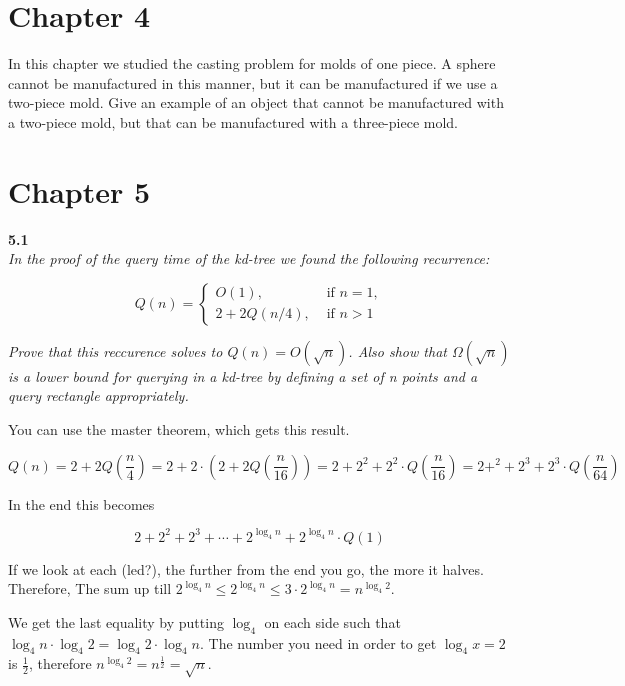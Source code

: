 \section{Chapter 4}%
\label{sec:label}

In this chapter we studied the casting problem for molds of one piece. A
sphere cannot be manufactured in this manner, but it can be manufactured
if we use a two-piece mold. Give an example of an object that cannot be
manufactured with a two-piece mold, but that can be manufactured with
a three-piece mold.


\section{Chapter 5}%
\label{sec:label}
\noindent
\textbf{5.1}\\
\noindent
\textit{In the proof of the query time of the kd-tree we found the following recurrence:}

\begin{equation}
	Q(n) = \begin{cases}
		O(1),      & \text{ if } n = 1, \\
		2+2Q(n/4), & \text{ if } n > 1
	\end{cases}
\end{equation}

\textit{	Prove that this reccurence solves to $Q(n) = O(\sqrt{n})$. Also show that $\Omega (\sqrt{n})$ is a lower bound for querying in a kd-tree by defining a set of n points and a query rectangle appropriately.}

You can use the master theorem, which gets this result.

\begin{equation*}
	Q(n) = 2+2Q(\frac{n}{4}) = 2 + 2 \cdot (2 + 2Q(\frac{n}{16})) = 2 + 2^{2} + 2^{2} \cdot Q(\frac{n}{16}) = 2 + ^{2} + 2^{3} + 2^{3} \cdot Q(\frac{n}{64})
\end{equation*}

In the end this becomes

\begin{equation*}
	2 + 2^{2} + 2^{3} + \cdots + 2^{\log_{4}n} + 2^{\log_{4}n} \cdot Q(1)
\end{equation*}

If we look at each (led?), the further from the end you go, the more it halves. Therefore, The sum up till $2^{\log_{4}n} \le 2^{\log_{4}n} \le 3 \cdot 2^{\log_{4}n} = n^{\log_{4}2}$.

We get the last equality by putting $\log_{4}$ on each side such that $\log_{4}n \cdot \log_{4}2 = \log_{4}2 \cdot \log_{4}n$. The number you need in order to get $\log_{4} x = 2$ is $\frac{1}{2}$, therefore $n^{\log_{4}2} = n^{\frac{1}{2}} = \sqrt{n}$.

